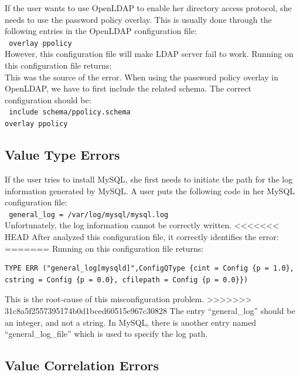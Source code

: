 If the user wants to use OpenLDAP to enable her directory access
protocol, she needs to use the password policy overlay. This is usually
done through the following entries in the OpenLDAP configuration file:\\
\texttt{
 \hspace*{3em}overlay ppolicy\\}
However, this configuration file will make LDAP server fail to work.
Running \app on this configuration file returns:
\\
This was the source of the error. When using the password policy overlay
in OpenLDAP, we have to first include the related schema. The correct configuration should be:\\
\texttt{
 \hspace*{3em}include schema/ppolicy.schema\\
 \hspace*{3em}overlay ppolicy\\
}

\subsection{Value Type Errors}

If the user tries to install MySQL, she first needs to 
initiate the path for the
log information generated by MySQL. A user puts the following code in 
her MySQL configuration file:\\
\texttt{
 \hspace*{3em}general\_log = /var/log/mysql/mysql.log\\}
Unfortunately, the log information cannot be correctly written.
<<<<<<< HEAD
After \app analyzed this configuration file, it correctly identifies the error:
\\
=======
Running \app on this configuration file returns:
\begin{verbatim}
TYPE ERR ("general_log[mysqld]",ConfigQType {cint = Config {p = 1.0}, cstring = Config {p = 0.0}, cfilepath = Config {p = 0.0}})
\end{verbatim}
This is the root-cause of this misconfiguration problem. 
>>>>>>> 31c8a5f2557395174b0d1bced60515e967c30828
The entry ``general\_log'' should be an integer, 
and not a string. In MySQL, there is another entry named
``general\_log\_file'' which is used to specify the log path.  

\subsection{Value Correlation Errors}


